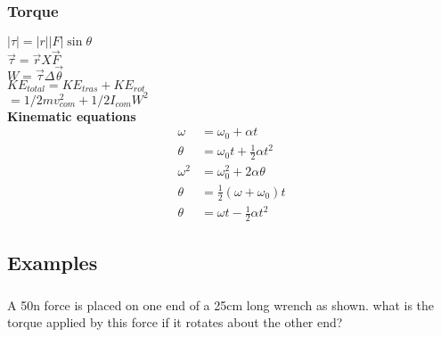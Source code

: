 \documentclass{article}
\begin{document}

    \hrulefill
    \subsubsection{\huge Torque}
        $|\tau| = |r| |F| \sin{\theta}$ \\
        $\vec{\tau} = \vec{r}X\vec{F}$ \\ 
        $W = \vec{\tau}\Delta\vec{\theta}$ \\

        $KE_{total} = KE_{tras} + KE_{rot}$ \\
         $=1/2mv^2_{com} +1/2I_{com}W^2$\\

        \textbf{Kinematic equations }
        \begin{align}
            \omega &= \omega_0 + \alpha t \\
            \theta &= \omega_0 t + \frac{1}{2} \alpha t^2 \\
            \omega^2 &= \omega_0^2 + 2\alpha \theta \\
            \theta &= \frac{1}{2} (\omega + \omega_0) t \\
            \theta &= \omega t - \frac{1}{2} \alpha t^2
            \end{align}
            
    \hrulefill

    \subsection{\large \centering Examples}
    \hrulefill
    \centering
    \subsubsection{}   
        A 50n force is placed on one end of a 25cm long wrench as shown. what is the torque applied by this force if it rotates about the other end? \\ [20pt]
\end{document}
